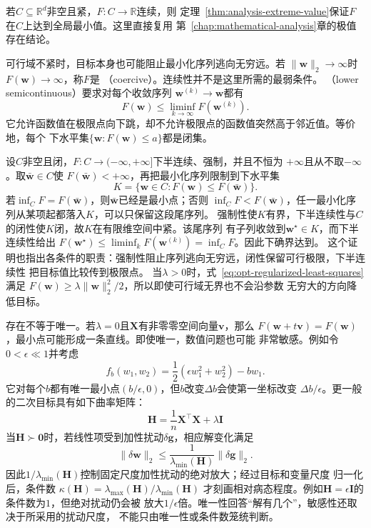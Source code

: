 若$C\subseteq\mathbb{R}^d$非空且紧，$F:C\to\mathbb{R}$连续，则
定理~\ref{thm:analysis-extreme-value}保证$F$在$C$上达到全局最小值。这里直接复用
第~\ref{chap:mathematical-analysis}章的极值存在结论。

可行域不紧时，目标本身也可能阻止最小化序列逃向无穷远。若
$\lVert\bm{w}\rVert_2\to\infty$时$F(\bm{w})\to\infty$，称$F$是
（coercive）。连续性并不是这里所需的最弱条件。
（lower semicontinuous）要求对每个收敛序列
$\bm{w}^{(k)}\to\bm{w}$都有
\[
  F(\bm{w})\leq\liminf_{k\to\infty}F(\bm{w}^{(k)}).
\]
它允许函数值在极限点向下跳，却不允许极限点的函数值突然高于邻近值。等价地，每个
下水平集$\{\bm{w}:F(\bm{w})\leq a\}$都是闭集。

设$C$非空且闭，$F:C\to(-\infty,+\infty]$下半连续、强制，并且不恒为
$+\infty$且从不取$-\infty$。取$\bar{\bm{w}}\in C$使
$F(\bar{\bm{w}})<+\infty$，再把最小化序列限制到下水平集
\[
  K=\{\bm{w}\in C:F(\bm{w})\leq F(\bar{\bm{w}})\}.
\]
若$\inf_C F=F(\bar{\bm{w}})$，则$\bar{\bm{w}}$已经是最小点；否则
$\inf_C F<F(\bar{\bm{w}})$，任一最小化序列从某项起都落入$K$，可以只保留这段尾序列。
强制性使$K$有界，下半连续性与$C$的闭性使$K$闭，故$K$在有限维空间中紧。该尾序列
有子列收敛到$\bm{w}^{\star}\in K$，而下半连续性给出
$F(\bm{w}^{\star})\leq\liminf_kF(\bm{w}^{(k)})=\inf_C F$。因此下确界达到。
这个证明也指出各条件的职责：强制性阻止序列逃向无穷远，闭性保留可行极限，下半连续性
把目标值比较传到极限点。
当$\lambda>0$时，式~\eqref{eq:opt-regularized-least-squares}满足
$F(\bm{w})\geq\lambda\lVert\bm{w}\rVert_2^2/2$，所以即使可行域无界也不会沿参数
无穷大的方向降低目标。

存在不等于唯一。若$\lambda=0$且$\bm{X}$有非零零空间向量$\bm{v}$，那么
$F(\bm{w}+t\bm{v})=F(\bm{w})$，最小点可能形成一条直线。即使唯一，数值问题也可能
非常敏感。例如令$0<\epsilon\ll1$并考虑
\[
  f_b(w_1,w_2)=\frac12(\epsilon w_1^2+w_2^2)-bw_1.
\]
它对每个$b$都有唯一最小点$(b/\epsilon,0)$，但$b$改变$\Delta b$会使第一坐标改变
$\Delta b/\epsilon$。更一般的二次目标具有如下曲率矩阵：
\[
  \bm{H}=\frac{1}{n}\bm{X}^{\top}\bm{X}+\lambda\bm{I}
\]
当$\bm{H}\succ\bm{0}$时，若线性项受到加性扰动$\delta\bm{g}$，相应解变化满足
\[
  \lVert\delta\bm{w}\rVert_2
  \leq
  \frac{1}{\lambda_{\min}(\bm{H})}
  \lVert\delta\bm{g}\rVert_2.
\]
因此$1/\lambda_{\min}(\bm{H})$控制固定尺度加性扰动的绝对放大；经过目标和变量尺度
归一化后，条件数
$\kappa(\bm{H})=\lambda_{\max}(\bm{H})/\lambda_{\min}(\bm{H})$
才刻画相对病态程度。例如$\bm{H}=\epsilon\bm{I}$的条件数为$1$，但绝对扰动仍会被
放大$1/\epsilon$倍。唯一性回答“解有几个”，敏感性还取决于所采用的扰动尺度，
不能只由唯一性或条件数笼统判断。

